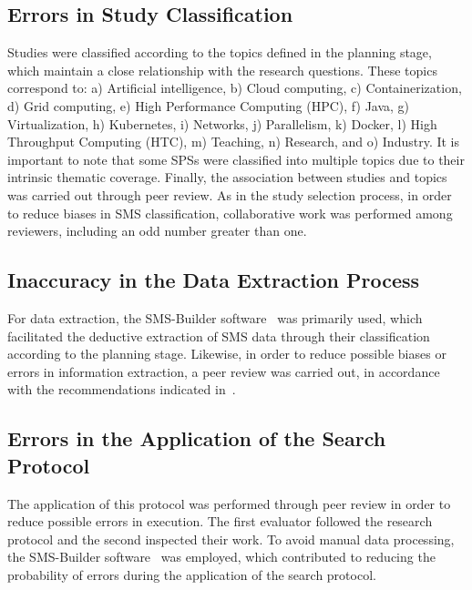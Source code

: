 \subsection{Errors in Study Classification}
Studies were classified according to the topics defined in the planning stage, which maintain a close relationship with the research questions.
These topics correspond to: a) Artificial intelligence, b) Cloud computing, c) Containerization, d) Grid computing, e) High Performance Computing (HPC), f) Java, g) Virtualization, h) Kubernetes, i) Networks, j) Parallelism, k) Docker, l) High Throughput Computing (HTC), m) Teaching, n) Research, and o) Industry.
It is important to note that some SPSs were classified into multiple topics due to their intrinsic thematic coverage. Finally, the association between studies and topics was carried out through peer review. As in the study selection process, in order to reduce biases in SMS classification, collaborative work was performed among reviewers, including an odd number greater than one.

\subsection{Inaccuracy in the Data Extraction Process}
For data extraction, the SMS-Builder software~\cite{sms-builder-repo} was primarily used, which facilitated the deductive extraction of SMS data through their classification according to the planning stage. Likewise, in order to reduce possible biases or errors in information extraction, a peer review was carried out, in accordance with the recommendations indicated in~\cite{Kitchenham2010792}.

\subsection{Errors in the Application of the Search Protocol}
The application of this protocol was performed through peer review in order to reduce possible errors in execution. The first evaluator followed the research protocol and the second inspected their work. To avoid manual data processing, the SMS-Builder software~\cite{sms-builder-repo} was employed, which contributed to reducing the probability of errors during the application of the search protocol.
